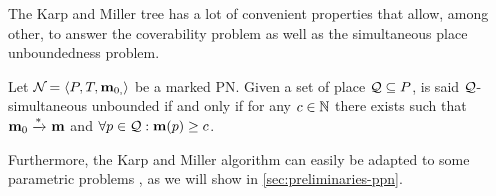 %
%
%
%
%
%
%
%
%

The Karp and Miller tree has a lot of convenient properties that allow, among other, to answer the coverability problem as well as the simultaneous place unboundedness problem.

\begin{defi}
  Let $\mathcal{N}_{} = \left\langle P_{}, T_{}, \mathbf{m}_{0,}\right\rangle$ be a marked \ac{PN}.
  Given a set of place $\mathcal{Q} \subseteq P$, \namePN is said $\mathcal{Q}$-simultaneous unbounded if and only if for any $c \in \mathbb{N}$ there exists \mar such that $\mathbf{m}_0 \xrightarrow{*}_{} \mathbf{m}$ and $\forall p \in \mathcal{Q} : \mathbf{m}(p) \geq c$.
\end{defi}

Furthermore, the Karp and Miller algorithm can easily be adapted to some parametric problems \cite{David17}, as we will show in \autoref{sec:preliminaries-ppn}.

